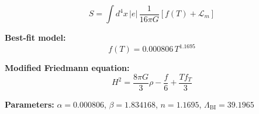 
\begin{equation}
  S = \int d^4x \, |e| \, \frac{1}{16\pi G} \left[ f(T) + \mathcal{L}_m \right]
\end{equation}

\textbf{Best-fit model:}
\begin{equation}
  f(T) = 0.000806 \, T^{1.1695}
\end{equation}

\textbf{Modified Friedmann equation:}
\begin{equation}
  H^2 = \frac{8\pi G}{3} \rho - \frac{f}{6} + \frac{T f_T}{3}
\end{equation}

\textbf{Parameters:}
$\alpha = 0.000806$, \quad
$\beta = 1.834168$, \quad
$n = 1.1695$, \quad
$\Lambda_{\text{BI}} = 39.1965$
